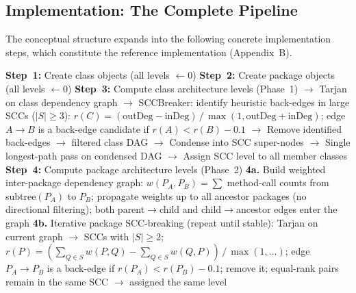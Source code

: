 \documentclass[a4paper,twoside]{article}
\begin{document}
\newpage
\subsection*{Implementation: The Complete Pipeline}

The conceptual structure expands into the following concrete
implementation steps, which constitute the reference implementation
(Appendix~B).

\setcounter{algocf}{0}
\vspace{1em}
\begin{algorithm}[H]
\caption{Complete Level Pipeline (\texttt{LevelCalculator})}
\DontPrintSemicolon
\textbf{Step~1:} Create class objects \hfill (all levels $\gets 0$)\;
\textbf{Step~2:} Create package objects \hfill (all levels $\gets 0$)\;
\BlankLine
\textbf{Step~3:} Compute class architecture levels (Phase~1)\;
\Indp
  $\rightarrow$ Tarjan on class dependency graph\;
  $\rightarrow$ SCCBreaker: identify heuristic back-edges in large SCCs ($|S| \ge 3$):\;
  \hspace{1.5em} $r(C)=(\text{outDeg}-\text{inDeg})\,/\,\max(1,\text{outDeg}+\text{inDeg})$;\;
  \hspace{1.5em} edge $A\!\to\!B$ is a back-edge candidate if $r(A)<r(B)-0.1$\;
  $\rightarrow$ Remove identified back-edges $\rightarrow$ filtered class DAG\;
  $\rightarrow$ Condense into SCC super-nodes\;
  $\rightarrow$ Single longest-path pass on condensed DAG\;
  $\rightarrow$ Assign SCC level to all member classes\;
\Indm
\BlankLine
\textbf{Step~4:} Compute package architecture levels (Phase~2)\;
\Indp
  \textbf{4a.} Build weighted inter-package dependency graph:\;
  \hspace{1.5em} $w(P_A, P_B)=\sum$ method-call counts from subtree$(P_A)$ to $P_B$;\;
  \hspace{1.5em} propagate weights up to all ancestor packages (no directional filtering);\;
  \hspace{1.5em} both parent$\to$child and child$\to$ancestor edges enter the graph\;
  \BlankLine
  \textbf{4b.} Iterative package SCC-breaking (repeat until stable):\;
  \hspace{1.5em} Tarjan on current graph $\to$ SCCs with $|S|\ge 2$;\;
  \hspace{1.5em} $r(P)=(\sum_{Q\in S}w(P,Q)-\sum_{Q\in S}w(Q,P))\,/\,\max(1,\ldots)$;\;
  \hspace{1.5em} edge $P_A\!\to\!P_B$ is a back-edge if $r(P_A)<r(P_B)-0.1$; remove it;\;
  \hspace{1.5em} equal-rank pairs remain in the same SCC $\to$ assigned the same level\;

\end{algorithm}
\end{document}
